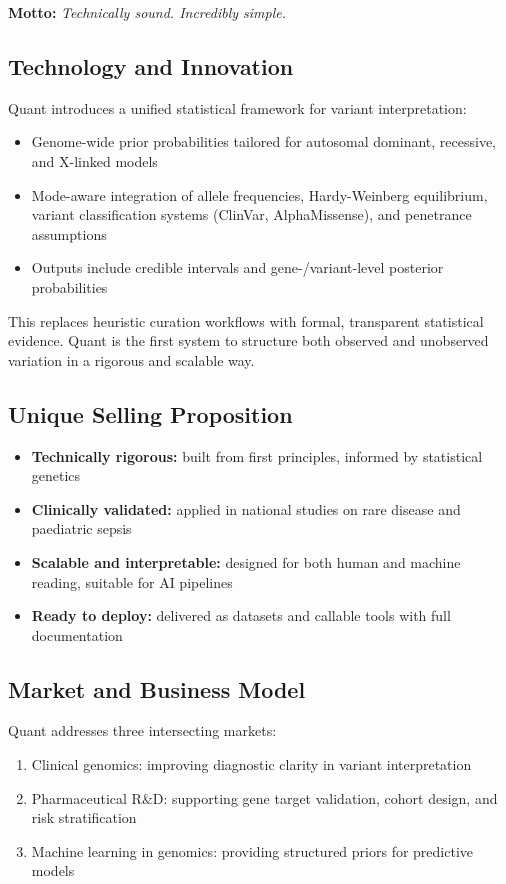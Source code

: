 \documentclass[preprint,12pt,fleqn]{article}
\begin{document}
\vspace{0.5em}
\noindent\textbf{Motto:} \textit{Technically sound. Incredibly simple.}

\subsection{Technology and Innovation}

Quant introduces a unified statistical framework for variant interpretation:
\begin{itemize}
  \item Genome-wide prior probabilities tailored for autosomal dominant, recessive, and X-linked models
  \item Mode-aware integration of allele frequencies, Hardy-Weinberg equilibrium, variant classification systems (ClinVar, AlphaMissense), and penetrance assumptions
  \item Outputs include credible intervals and gene-/variant-level posterior probabilities
\end{itemize}

This replaces heuristic curation workflows with formal, transparent statistical evidence. Quant is the first system to structure both observed and unobserved variation in a rigorous and scalable way.

\subsection{Unique Selling Proposition}

\begin{itemize}
  \item \textbf{Technically rigorous:} built from first principles, informed by statistical genetics
  \item \textbf{Clinically validated:} applied in national studies on rare disease and paediatric sepsis
  \item \textbf{Scalable and interpretable:} designed for both human and machine reading, suitable for AI pipelines
  \item \textbf{Ready to deploy:} delivered as datasets and callable tools with full documentation
\end{itemize}

\subsection{Market and Business Model}

Quant addresses three intersecting markets:
\begin{enumerate}
  \item Clinical genomics: improving diagnostic clarity in variant interpretation
  \item Pharmaceutical R\&D: supporting gene target validation, cohort design, and risk stratification
  \item Machine learning in genomics: providing structured priors for predictive models
\end{enumerate}
\end{document}
